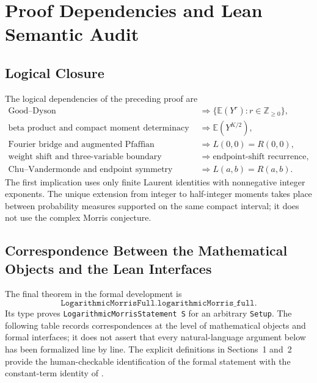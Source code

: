 \documentclass[11pt,a4paper]{article}
\theoremstyle{definition}
\begin{document}
\section{Proof Dependencies and Lean Semantic Audit}
\label{sec:lean-audit}

\subsection{Logical Closure}

The logical dependencies of the preceding proof are
\begin{align*}
\text{Good--Dyson}
&\Longrightarrow \{\mathbb E(Y^r):r\in\mathbb Z_{\ge0}\},\\
\text{beta product and compact moment determinacy}
&\Longrightarrow \mathbb E(Y^{K/2}),\\
\text{Fourier bridge and augmented Pfaffian}
&\Longrightarrow L(0,0)=R(0,0),\\
\text{weight shift and three-variable boundary vanishing}
&\Longrightarrow \text{endpoint-shift recurrence},\\
\text{Chu--Vandermonde and endpoint symmetry}
&\Longrightarrow L(a,b)=R(a,b).
\end{align*}
The first implication uses only finite Laurent identities with
nonnegative integer exponents.  The unique extension from integer to
half-integer moments takes place between probability measures supported
on the same compact interval; it does not use the complex Morris
conjecture.

\subsection{Correspondence Between the Mathematical Objects and the Lean Interfaces}

The final theorem in the formal development is
\[
\texttt{LogarithmicMorrisFull.logarithmicMorris\_full}.
\]
Its type proves \texttt{LogarithmicMorrisStatement S} for an arbitrary
\texttt{Setup}. The following table records correspondences at the level
of mathematical objects and formal interfaces; it does not assert that
every natural-language argument below has been formalized line by line.
The explicit definitions in Sections~1 and~2 provide the human-checkable
identification of the formal statement with the constant-term identity
of \cite[Theorem~1.3]{LogMorris}.
\end{document}
